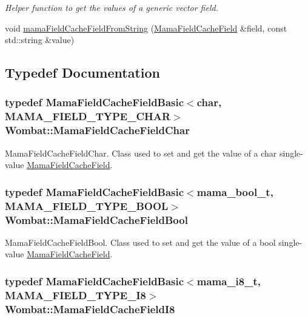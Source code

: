 \begin{DoxyCompactItemize}
$$\begin{DoxyCompactList}\small\item\em Helper function to get the values of a generic vector field. \item\end{DoxyCompactList}\item 
void \hyperlink{namespaceWombat_a07b7312ba1c685678e4d7787a38e5eb6}{mamaFieldCacheFieldFromString} (\hyperlink{classWombat_1_1MamaFieldCacheField}{MamaFieldCacheField} \&field, const std::string \&value)
\end{DoxyCompactItemize}


\subsection{Typedef Documentation}
\hypertarget{namespaceWombat_afc2d1a3ad124600d17c392fddac87751}{
\subsubsection[{MamaFieldCacheFieldChar}]{\setlength{\rightskip}{0pt plus 5cm}typedef {\bf MamaFieldCacheFieldBasic}$<$char, MAMA\_\-FIELD\_\-TYPE\_\-CHAR$>$ {\bf Wombat::MamaFieldCacheFieldChar}}}
\label{namespaceWombat_afc2d1a3ad124600d17c392fddac87751}


MamaFieldCacheFieldChar. Class used to set and get the value of a char single-\/value {\ttfamily \hyperlink{classWombat_1_1MamaFieldCacheField}{MamaFieldCacheField}}. \hypertarget{namespaceWombat_a3221e78548dcebb66e0dd62cccf5d523}{
\subsubsection[{MamaFieldCacheFieldBool}]{\setlength{\rightskip}{0pt plus 5cm}typedef {\bf MamaFieldCacheFieldBasic}$<$mama\_\-bool\_\-t, MAMA\_\-FIELD\_\-TYPE\_\-BOOL$>$ {\bf Wombat::MamaFieldCacheFieldBool}}}
\label{namespaceWombat_a3221e78548dcebb66e0dd62cccf5d523}


MamaFieldCacheFieldBool. Class used to set and get the value of a bool single-\/value {\ttfamily \hyperlink{classWombat_1_1MamaFieldCacheField}{MamaFieldCacheField}}. \hypertarget{namespaceWombat_a0d3967caf47e313155334a4834ecf74c}{
\subsubsection[{MamaFieldCacheFieldI8}]{\setlength{\rightskip}{0pt plus 5cm}typedef {\bf MamaFieldCacheFieldBasic}$<$mama\_\-i8\_\-t, MAMA\_\-FIELD\_\-TYPE\_\-I8$>$ {\bf Wombat::MamaFieldCacheFieldI8}}}
\label{namespaceWombat_a0d3967caf47e313155334a4834ecf74c}


